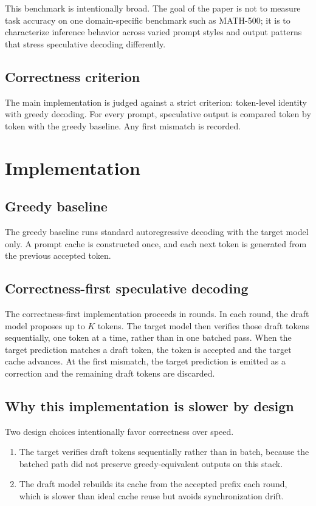 \documentclass[11pt]{article}
\begin{document}
This benchmark is intentionally broad. The goal of the paper is not to measure task accuracy on one domain-specific benchmark such as MATH-500; it is to characterize inference behavior across varied prompt styles and output patterns that stress speculative decoding differently.

\subsection{Correctness criterion}
The main implementation is judged against a strict criterion: token-level identity with greedy decoding. For every prompt, speculative output is compared token by token with the greedy baseline. Any first mismatch is recorded.

\section{Implementation}

\subsection{Greedy baseline}
The greedy baseline runs standard autoregressive decoding with the target model only. A prompt cache is constructed once, and each next token is generated from the previous accepted token.

\subsection{Correctness-first speculative decoding}
The correctness-first implementation proceeds in rounds. In each round, the draft model proposes up to $K$ tokens. The target model then verifies those draft tokens sequentially, one token at a time, rather than in one batched pass. When the target prediction matches a draft token, the token is accepted and the target cache advances. At the first mismatch, the target prediction is emitted as a correction and the remaining draft tokens are discarded.

\subsection{Why this implementation is slower by design}
Two design choices intentionally favor correctness over speed.
\begin{enumerate}
    \item The target verifies draft tokens sequentially rather than in batch, because the batched path did not preserve greedy-equivalent outputs on this stack.
    \item The draft model rebuilds its cache from the accepted prefix each round, which is slower than ideal cache reuse but avoids synchronization drift.
\end{enumerate}
\end{document}
